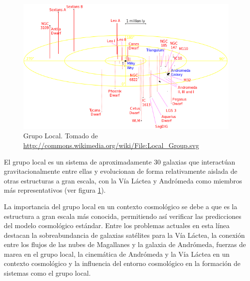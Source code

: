 \
\begin{figure}[htbp]
	\centering
	\includegraphics[width=1.0\textwidth]
	{./figures/1_introduction/LocalGroup.png}
	
	\caption{\small{Grupo Local. Tomado de 
	\url{http://commons.wikimedia.org/wiki/File:Local_Group.svg}}}
	
	\label{fig:LocalGroup}
\end{figure}


El grupo local es un sistema de aproximadamente 30 galaxias que interactúan
gravitacionalmente entre ellas y evolucionan de forma relativamente aislada
de otras estructuras a gran escala, con la Vía Láctea y Andrómeda como 
miembros más representativos (ver figura \ref{fig:LocalGroup}).


La importancia del grupo local en un contexto cosmológico se debe a que es
la estructura a gran escala más conocida, permitiendo así verificar las 
predicciones del modelo cosmológico estándar. Entre los problemas actuales
en esta línea destacan la sobreabundancia de galaxias satélites para la 
Vía Láctea, la conexión entre los flujos de las nubes de Magallanes y la
galaxia de Andrómeda, fuerzas de marea en el grupo local, la cinemática 
de Andrómeda y la Vía Láctea en un contexto cosmológico \cite{forero2013}
y la influencia del entorno cosmológico en la formación de sistemas como
el grupo local.







